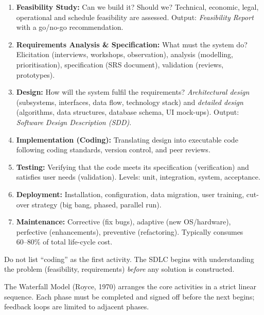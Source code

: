 \documentclass[11pt]{article}
\newcommand{\cle}[1]{{\popxbold\color{popdark}#1}}
\newcounter{popsec}
\newcounter{popsub}
\newcommand{\courssub}[1]{%
  \stepcounter{popsub}%
  \par\vspace{9pt}\noindent{\popxbold\fontsize{11.5}{13}\selectfont\color{popink}{\color{poporange}\thepopsec.\thepopsub}\hspace{6pt}#1}\par\nopagebreak\vspace{4pt}
}
\begin{document}
\begin{experience}
\begin{enumerate}
\item \textbf{Feasibility Study:} Can we build it? Should we? Technical, economic, legal, operational and schedule feasibility are assessed. Output: \emph{Feasibility Report} with a go/no-go recommendation.
\item \textbf{Requirements Analysis \& Specification:} What must the system do? Elicitation (interviews, workshops, observation), analysis (modelling, prioritisation), specification (SRS document), validation (reviews, prototypes).
\item \textbf{Design:} How will the system fulfil the requirements? \emph{Architectural design} (subsystems, interfaces, data flow, technology stack) and \emph{detailed design} (algorithms, data structures, database schema, UI mock-ups). Output: \emph{Software Design Description (SDD)}.
\item \textbf{Implementation (Coding):} Translating design into executable code following coding standards, version control, and peer reviews.
\item \textbf{Testing:} Verifying that the code meets its specification (verification) and satisfies user needs (validation). Levels: unit, integration, system, acceptance.
\item \textbf{Deployment:} Installation, configuration, data migration, user training, cut-over strategy (big bang, phased, parallel run).
\item \textbf{Maintenance:} Corrective (fix bugs), adaptive (new OS/hardware), perfective (enhancements), preventive (refactoring). Typically consumes $60\text{--}80\%$ of total life-cycle cost.
\end{enumerate}
\end{experience}

\begin{attention}
Do not list ``coding'' as the first activity. The SDLC begins with understanding the problem (feasibility, requirements) \emph{before} any solution is constructed.
\end{attention}

\courssub{The Waterfall Model}

The \cle{Waterfall Model} (Royce, 1970) arranges the core activities in a strict linear sequence. Each phase must be completed and signed off before the next begins; feedback loops are limited to adjacent phases.
\end{document}
